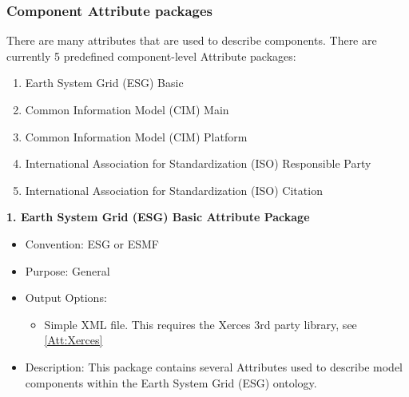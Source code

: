 \subsubsection{Component Attribute packages}
\label{ComponentAttributePackages}

There are many attributes that are used to describe components. There are currently 5 predefined component-level Attribute packages:

\begin{enumerate}
    \item Earth System Grid (ESG) Basic
    \item Common Information Model (CIM) Main
    \item Common Information Model (CIM) Platform
    \item International Association for Standardization (ISO) Responsible Party
    \item International Association for Standardization (ISO) Citation
\end{enumerate}

\vspace{.20in}

{\bf 1. Earth System Grid (ESG) Basic Attribute Package}

\begin{itemize}
    \item Convention: ESG or ESMF
    \item Purpose: General
    \item Output Options:
    \begin{itemize}
        \item{Simple XML file. This requires the Xerces 3rd party library, see \ref{Att:Xerces}}
    \end{itemize} 
    \item Description: This package contains several Attributes used to describe model components within the Earth System Grid (ESG) ontology. 
\end{itemize}


